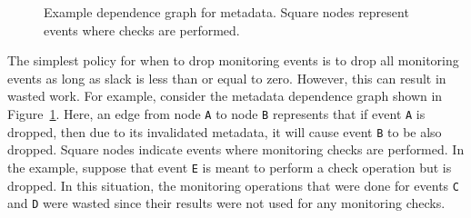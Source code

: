 \begin{figure}
\begin{center}
    \vspace{-0.3in}
    \caption{Example dependence graph for metadata. Square nodes represent
    events where checks are performed.} 
    \label{fig:drop.dataflow_graph}
    \vspace{-0.1in}
  \end{center}
\end{figure}

The simplest policy for when to drop monitoring events is to drop all monitoring events as
long as slack is less than or equal to zero.  However, this can result in
wasted work. For example, consider the metadata dependence graph shown in
Figure~\ref{fig:drop.dataflow_graph}. Here, an edge from node {\tt A} to node
{\tt B} represents that if event {\tt A} is dropped, then due to its
invalidated metadata, it will cause event {\tt B} to be also dropped. Square
nodes indicate events where monitoring checks are performed. In the
example, suppose that event {\tt E} is meant to perform a check operation but is dropped.
In this situation, the
monitoring operations that were done for events {\tt C} and {\tt D} were wasted
since their results were not used for any monitoring checks.

